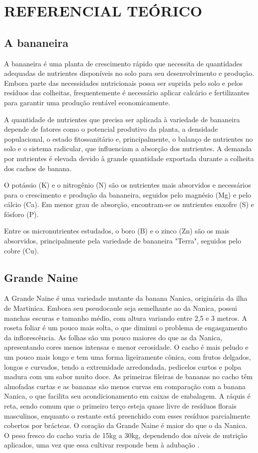 
\chapter{REFERENCIAL TEÓRICO}
\section{A bananeira}
A bananeira é uma planta de crescimento rápido que necessita de quantidades adequadas de nutrientes disponíveis no solo para seu desenvolvimento e produção. Embora parte das necessidades nutricionais possa ser suprida pelo solo e pelos resíduos das colheitas, frequentemente é necessário aplicar calcário e fertilizantes para garantir uma produção rentável economicamente.

A quantidade de nutrientes que precisa ser aplicada à variedade de bananeira depende de fatores como o potencial produtivo da planta, a densidade populacional, o estado fitossanitário e, principalmente, o balanço de nutrientes no solo e o sistema radicular, que influenciam a absorção dos nutrientes. A demanda por nutrientes é elevada devido à grande quantidade exportada durante a colheita dos cachos de banana.

O potássio (K) e o nitrogênio (N) são os nutrientes mais absorvidos e necessários para o crescimento e produção da bananeira, seguidos pelo magnésio (Mg) e pelo cálcio (Ca). Em menor grau de absorção, encontram-se os nutrientes enxofre (S) e fósforo (P).

Entre os micronutrientes estudados, o boro (B) e o zinco (Zn) são os mais absorvidos, principalmente pela variedade de bananeira "Terra", seguidos pelo cobre (Cu).

\section{Grande Naine}
A Grande Naine é uma variedade mutante da banana Nanica, originária da ilha de Martinica. Embora seu pseudocaule seja semelhante ao da Nanica, possui manchas escuras e tamanho médio, com altura variando entre 2,5 e 3 metros. A roseta foliar é um pouco mais solta, o que diminui o problema de engasgamento da inflorescência. As folhas são um pouco maiores do que as da Nanica, apresentando cores menos intensas e menor cerosidade. O cacho é mais peludo e um pouco mais longo e tem uma forma ligeiramente cônica, com frutos delgados, longos e curvados, tendo a extremidade arredondada, pedicelos curtos e polpa madura com um sabor muito doce. As primeiras fileiras de bananas no cacho têm almofadas curtas e as bananas são menos curvas em comparação com a banana Nanica, o que facilita seu acondicionamento em caixas de embalagem. A ráquis é reta, sendo comum que o primeiro terço esteja quase livre de resíduos florais masculinos, enquanto o restante está preenchido com esses resíduos parcialmente cobertos por brácteas. O coração da Grande Naine é maior do que o da Nanica. O peso fresco do cacho varia de 15kg a 30kg, dependendo dos níveis de nutrição aplicados, uma vez que essa cultivar responde bem à adubação \cite{cultivodebananeira}.

